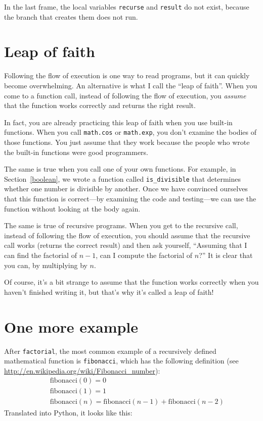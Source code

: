 \documentclass[10pt]{book}
\begin{document}
In the last frame, the local
variables {\tt recurse} and {\tt result} do not exist, because
the branch that creates them does not run.


\section{Leap of faith}

Following the flow of execution is one way to read programs, but
it can quickly become overwhelming.  An
alternative is what I call the ``leap of faith''.  When you come to a
function call, instead of following the flow of execution, you {\em
assume} that the function works correctly and returns the right
result.

In fact, you are already practicing this leap of faith when you use
built-in functions.  When you call {\tt math.cos} or {\tt math.exp},
you don't examine the bodies of those functions.  You just
assume that they work because the people who wrote the built-in
functions were good programmers.

The same is true when you call one of your own functions.  For
example, in Section~\ref{boolean}, we wrote a function called 
\verb"is_divisible" that determines whether one number is divisible by
another.  Once we have convinced ourselves that this function is
correct---by examining the code and testing---we can use the function
without looking at the body again.

The same is true of recursive programs.  When you get to the recursive
call, instead of following the flow of execution, you should assume
that the recursive call works (returns the correct result) and then ask
yourself, ``Assuming that I can find the factorial of $n-1$, can I
compute the factorial of $n$?''  It is clear that you
can, by multiplying by $n$.

Of course, it's a bit strange to assume that the function works
correctly when you haven't finished writing it, but that's why
it's called a leap of faith!


\section{One more example}
\label{one.more.example}

After {\tt factorial}, the most common example of a recursively
defined mathematical function is {\tt fibonacci}, which has the
following definition (see
  \url{http://en.wikipedia.org/wiki/Fibonacci_number}):
%
\begin{eqnarray*}
&& \mathrm{fibonacci}(0) = 0 \\
&& \mathrm{fibonacci}(1) = 1 \\
&& \mathrm{fibonacci}(n) = \mathrm{fibonacci}(n-1) + \mathrm{fibonacci}(n-2)
\end{eqnarray*}
%
Translated into Python, it looks like this:
\end{document}
